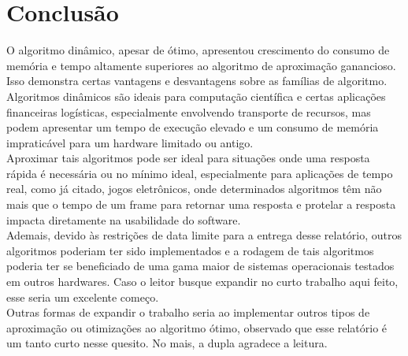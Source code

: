 \documentclass{article}
\begin{document}
\section{Conclusão}
    O algoritmo dinâmico, apesar de ótimo, apresentou crescimento do consumo de memória e tempo altamente superiores ao algoritmo de aproximação ganancioso. Isso demonstra certas vantagens e desvantagens sobre as famílias de algoritmo.\\
    Algoritmos dinâmicos são ideais para computação científica e certas aplicações financeiras logísticas, especialmente envolvendo transporte de recursos, mas podem apresentar um tempo de execução elevado e um consumo de memória impraticável para um hardware limitado ou antigo.\\
    Aproximar tais algoritmos pode ser ideal para situações onde uma resposta rápida é necessária ou no mínimo ideal, especialmente para aplicações de tempo real, como já citado, jogos eletrônicos, onde determinados algoritmos têm não mais que o tempo de um frame para retornar uma resposta e protelar a resposta impacta diretamente na usabilidade do software.\\
    Ademais, devido às restrições de data limite para a entrega desse relatório, outros algoritmos poderiam ter sido implementados e a rodagem de tais algoritmos poderia ter se beneficiado de uma gama maior de sistemas operacionais testados em outros hardwares. Caso o leitor busque expandir no curto trabalho aqui feito, esse seria um excelente começo.\\
    Outras formas de expandir o trabalho seria ao implementar outros tipos de aproximação ou otimizações ao algoritmo ótimo, observado que esse relatório é um tanto curto nesse quesito.
    No mais, a dupla agradece a leitura. 
\end{document}
